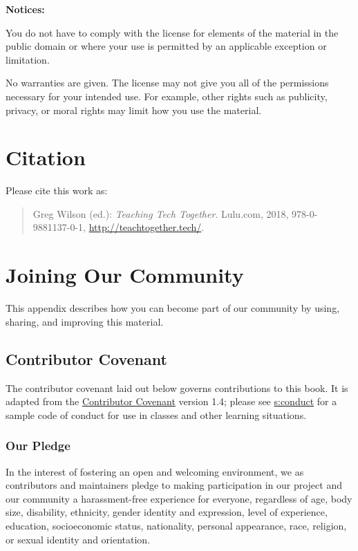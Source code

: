 \textbf{Notices:}

You do not have to comply with the license for elements of the
material in the public domain or where your use is permitted by an
applicable exception or limitation.

No warranties are given. The license may not give you all of the
permissions necessary for your intended use. For example, other rights
such as publicity, privacy, or moral rights may limit how you use the
material.

\chapter{Citation}\label{s:citation}

Please cite this work as:

\begin{quote}\setlength{\parindent}{0pt}
Greg Wilson (ed.): \emph{Teaching Tech Together}. Lulu.com, 2018,
978-0-9881137-0-1, \url{http://teachtogether.tech/}.
\end{quote}

\chapter{Joining Our Community}\label{s:joining}

This appendix describes how you can become part of our community by
using, sharing, and improving this material.

\section{Contributor Covenant}\label{s:joining-covenant}

The contributor covenant laid out below governs contributions to this
book. It is adapted from the \href{https://www.contributor-covenant.org}{Contributor Covenant} version
1.4; please see \protect\hyperlink{APPENDIX}{s:conduct} for a sample code of conduct
for use in classes and other learning situations.

\subsection{Our Pledge}\label{our-pledge}

In the interest of fostering an open and welcoming environment, we as
contributors and maintainers pledge to making participation in our
project and our community a harassment-free experience for everyone,
regardless of age, body size, disability, ethnicity, gender identity and
expression, level of experience, education, socioeconomic status,
nationality, personal appearance, race, religion, or sexual identity and
orientation.

